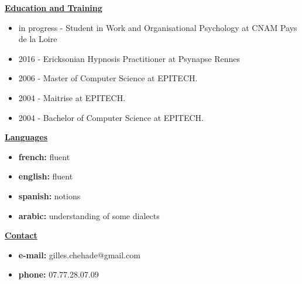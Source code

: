 \documentclass[a4paper,10pt]{letter}
\begin{document}
\underline{\textbf{Education and Training}}\\
\begin{itemize}
\item in progress - Student in Work and Organisational Psychology at CNAM Pays de la Loire
\item 2016 - Ericksonian Hypnosis Practitioner at Psynapse Rennes
\item 2006 - Master of Computer Science at {EPITECH.}
\item 2004 - Maitrise at {EPITECH.}
\item 2004 - Bachelor of Computer Science at {EPITECH.}\\
\end{itemize}

\underline{\textbf{Languages}}\\
\begin{itemize}
\item	\textbf{french:}  fluent
\item	\textbf{english:} fluent
\item	\textbf{spanish:} notions
\item	\textbf{arabic:}  understanding of some dialects\\
\end{itemize}

\underline{\textbf{Contact}}\\
\begin{itemize}
\item	\textbf{e-mail:}	gilles.chehade@gmail.com
\item	\textbf{phone:}	07.77.28.07.09
\end{itemize}

\pagebreak
\end{document}
